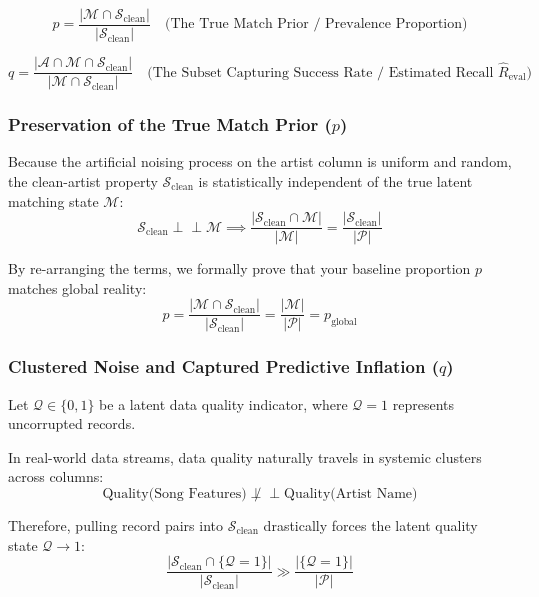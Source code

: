 \begin{equation}
p = \frac{|\mathcal{M} \cap \mathcal{S}_{\text{clean}}|}{|\mathcal{S}_{\text{clean}}|} \quad \text{(The True Match Prior / Prevalence Proportion)}
\end{equation}

\begin{equation}
q = \frac{|\mathcal{A} \cap \mathcal{M} \cap \mathcal{S}_{\text{clean}}|}{|\mathcal{M} \cap \mathcal{S}_{\text{clean}}|} \quad \text{(The Subset Capturing Success Rate / Estimated Recall } \widehat{R}_{\text{eval}}\text{)}
\end{equation}

\subsubsection{Preservation of the True Match Prior ($p$)}
Because the artificial noising process on the artist column is uniform and random, the clean-artist property $\mathcal{S}_{\text{clean}}$ is statistically independent of the true latent matching state $\mathcal{M}$:
\begin{equation}
\mathcal{S}_{\text{clean}} \perp \!\! \perp \mathcal{M} \implies \frac{|\mathcal{S}_{\text{clean}} \cap \mathcal{M}|}{|\mathcal{M}|} = \frac{|\mathcal{S}_{\text{clean}}|}{|\mathcal{P}|}
\end{equation}

By re-arranging the terms, we formally prove that your baseline proportion $p$ matches global reality:
\begin{equation}
p = \frac{|\mathcal{M} \cap \mathcal{S}_{\text{clean}}|}{|\mathcal{S}_{\text{clean}}|} = \frac{|\mathcal{M}|}{|\mathcal{P}|} = p_{\text{global}}
\end{equation}

\subsubsection{Clustered Noise and Captured Predictive Inflation ($q$)}
Let $\mathcal{Q} \in \{0, 1\}$ be a latent data quality indicator, where $\mathcal{Q} = 1$ represents uncorrupted records. 

In real-world data streams, data quality naturally travels in systemic clusters across columns:
\begin{equation}
\text{Quality(Song Features)} \not\perp \!\! \perp \text{Quality(Artist Name)}
\end{equation}

Therefore, pulling record pairs into $\mathcal{S}_{\text{clean}}$ drastically forces the latent quality state $\mathcal{Q} \to 1$:
\begin{equation}
\frac{|\mathcal{S}_{\text{clean}} \cap \{\mathcal{Q}=1\}|}{|\mathcal{S}_{\text{clean}}|} \gg \frac{|\{\mathcal{Q}=1\}|}{|\mathcal{P}|}
\end{equation}

